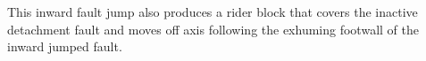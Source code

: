 This inward fault jump also produces a rider block that covers the inactive detachment fault and moves off axis following the exhuming footwall of the inward jumped fault.




